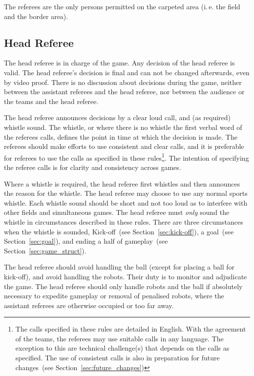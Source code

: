 \documentclass[12pt]{article}
\newcommand{\ie}{\mbox{i.\,e.}\xspace}
\newcommand{\cf}{see\xspace}
\begin{document}
The referees are the only persons permitted on the carpeted area (\ie the field and the border area).

\subsection{Head Referee}
\label{sec:head_referee}

The head referee is in charge of the game. Any decision of the head referee is valid. The head referee's decision is final and can not be changed afterwards, even by video proof. There is no discussion about decisions during the game, neither between the assistant referees and the head referee, nor between the audience or the teams and the head referee.

The head referee announces decisions by a clear loud call, and (as required) whistle sound.
The whistle, or where there is no whistle the first verbal word of the referees calls, defines the point in time at which the decision is made.
The referees should make efforts to use consistent and clear calls, and it is preferable for referees to use the calls as specified in these rules\footnote{The calls specified in these rules are detailed in English. With the agreement of the teams, the referees may use suitable calls in any language. The exception to this are technical challenge(s) that depends on the calls as specified. The use of consistent calls is also in preparation for future changes~(\cf Section~\ref{sec:future_changes})}.
The intention of specifying the referee calls is for clarity and consistency across games.

Where a whistle is required, the head referee first whistles and then announces the reason for the whistle.
The head referee may choose to use any normal sports whistle.
Each whistle sound should be short and not too loud as to interfere with other fields and simultaneous games.
The head referee must \textit{only} sound the whistle in circumstances described in these rules.
There are three circumstances when the whistle is sounded, Kick-off~(\cf Section~\ref{sec:kick-off}), a goal~(\cf Section~\ref{sec:goal}), and ending a half of gameplay~(\cf Section~\ref{sec:game_struct}).

The head referee should avoid handling the ball (except for placing a ball for kick-off), and avoid handling the robots.
Their duty is to monitor and adjudicate the game.
The head referee should only handle robots and the ball if absolutely necessary to expedite gameplay or removal of penalised robots, where the assistant referees are otherwise occupied or too far away.
\end{document}
